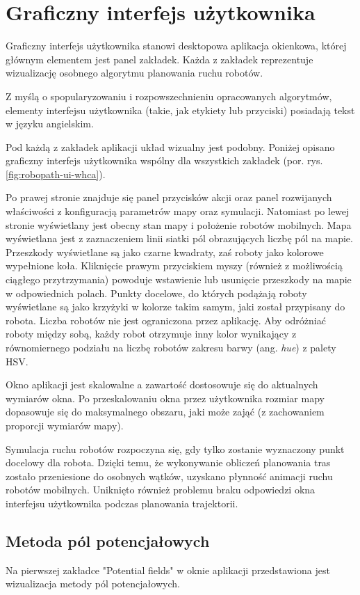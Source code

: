 \section{Graficzny interfejs użytkownika}
Graficzny interfejs użytkownika stanowi desktopowa aplikacja okienkowa, której głównym elementem jest panel zakładek. Każda z zakładek reprezentuje wizualizację osobnego algorytmu planowania ruchu robotów.

Z myślą o spopularyzowaniu i rozpowszechnieniu opracowanych algorytmów, elementy interfejsu użytkownika (takie, jak etykiety lub przyciski) posiadają tekst w języku angielskim.

Pod każdą z zakładek aplikacji układ wizualny jest podobny. Poniżej opisano graficzny interfejs użytkownika wspólny dla wszystkich zakładek (por. rys. \ref{fig:robopath-ui-whca}).

Po prawej stronie znajduje się panel przycisków akcji oraz panel rozwijanych właściwości z konfiguracją parametrów mapy oraz symulacji. Natomiast po lewej stronie wyświetlany jest obecny stan mapy i położenie robotów mobilnych. Mapa wyświetlana jest z zaznaczeniem linii siatki pól obrazujących liczbę pól na mapie. Przeszkody wyświetlane są jako czarne kwadraty, zaś roboty jako kolorowe wypełnione koła.
Kliknięcie prawym przyciskiem myszy (również z możliwością ciągłego przytrzymania) powoduje wstawienie lub usunięcie przeszkody na mapie w odpowiednich polach.
Punkty docelowe, do których podążają roboty wyświetlane są jako krzyżyki w kolorze takim samym, jaki został przypisany do robota. Liczba robotów nie jest ograniczona przez aplikację. Aby odróżniać roboty między sobą, każdy robot otrzymuje inny kolor wynikający z równomiernego podziału na liczbę robotów zakresu barwy (ang. {\it hue}) z palety HSV.

Okno aplikacji jest skalowalne a zawartość dostosowuje się do aktualnych wymiarów okna.
Po przeskalowaniu okna przez użytkownika rozmiar mapy dopasowuje się do maksymalnego obszaru, jaki może zająć (z zachowaniem proporcji wymiarów mapy).

Symulacja ruchu robotów rozpoczyna się, gdy tylko zostanie wyznaczony punkt docelowy dla robota. Dzięki temu, że wykonywanie obliczeń planowania tras zostało przeniesione do osobnych wątków, uzyskano płynność animacji ruchu robotów mobilnych. Uniknięto również problemu braku odpowiedzi okna interfejsu użytkownika podczas planowania trajektorii.

\subsection{Metoda pól potencjałowych}
Na pierwszej zakładce "Potential fields" w oknie aplikacji przedstawiona jest wizualizacja metody pól potencjałowych.

